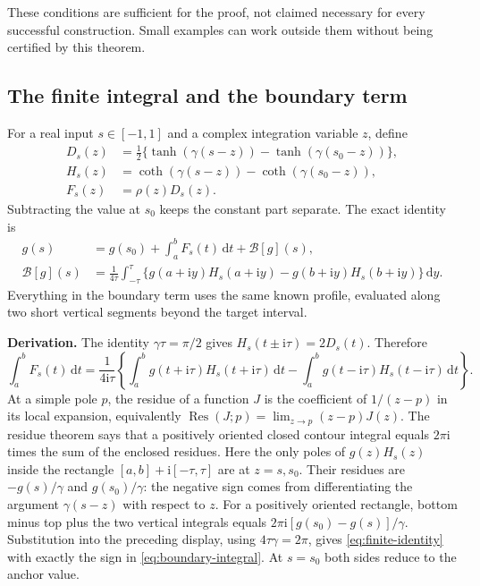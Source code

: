 \documentclass[11pt]{article}
\newcommand{\ii}{\mathrm i}
\newcommand{\dd}{\,\mathrm d}
\newcommand{\Res}{\operatorname{Res}}
\begin{document}
These conditions are sufficient for the proof, not claimed necessary for every successful construction. Small examples can work outside them without being certified by this theorem.

\subsection{The finite integral and the boundary term}

For a real input $s\in[-1,1]$ and a complex integration variable $z$, define
\begin{align}
 D_s(z)&=\tfrac12\{\tanh(\gamma(s-z))-\tanh(\gamma(s_0-z))\},\\
 H_s(z)&=\coth(\gamma(s-z))-\coth(\gamma(s_0-z)),\\
 F_s(z)&=\rho(z)D_s(z).
\end{align}
Subtracting the value at $s_0$ keeps the constant part separate. The exact identity is
\begin{align}
 g(s)&=g(s_0)+\int_a^b F_s(t)\dd t+\mathcal B[g](s),
 \label{eq:finite-identity}\\
 \mathcal B[g](s)&=\frac1{4\tau}\int_{-\tau}^{\tau}
 \{g(a+\ii y)H_s(a+\ii y)-g(b+\ii y)H_s(b+\ii y)\}\dd y.
 \label{eq:boundary-integral}
\end{align}
Everything in the boundary term uses the same known profile, evaluated along two short vertical segments beyond the target interval.

\textbf{Derivation.} The identity $\gamma\tau=\pi/2$ gives
$H_s(t\pm\ii\tau)=2D_s(t)$. Therefore
\[
 \int_a^b F_s(t)\dd t=\frac1{4\ii\tau}
 \left\{\int_a^b g(t+\ii\tau)H_s(t+\ii\tau)\dd t
 -\int_a^b g(t-\ii\tau)H_s(t-\ii\tau)\dd t\right\}.
\]
At a simple pole $p$, the residue of a function $J$ is the coefficient of $1/(z-p)$ in its local expansion, equivalently $\Res(J;p)=\lim_{z\to p}(z-p)J(z)$. The residue theorem says that a positively oriented closed contour integral equals $2\pi\ii$ times the sum of the enclosed residues. Here the only poles of $g(z)H_s(z)$ inside the rectangle
$[a,b]+\ii[-\tau,\tau]$ are at $z=s,s_0$. Their residues are
$-g(s)/\gamma$ and $g(s_0)/\gamma$: the negative sign comes from differentiating the argument $\gamma(s-z)$ with respect to $z$. For a positively oriented rectangle, bottom minus top plus the two vertical integrals equals
$2\pi\ii[g(s_0)-g(s)]/\gamma$. Substitution into the preceding display, using $4\tau\gamma=2\pi$, gives \eqref{eq:finite-identity} with exactly the sign in \eqref{eq:boundary-integral}. At $s=s_0$ both sides reduce to the anchor value.
\end{document}
